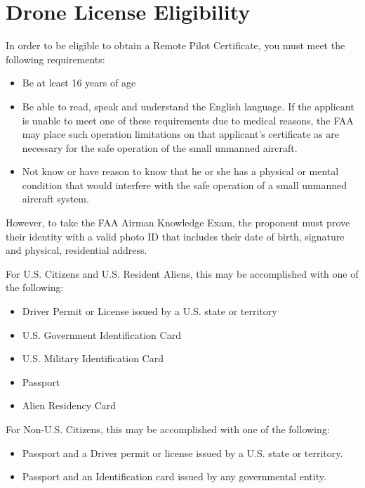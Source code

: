 \documentclass[
]{book}
\providecommand{\tightlist}{%
  \setlength{\itemsep}{0pt}\setlength{\parskip}{0pt}}
\begin{document}
\hypertarget{drone-license-eligibility}{%
\section{Drone License Eligibility}\label{drone-license-eligibility}}

In order to be eligible to obtain a Remote Pilot Certificate, you must meet the following requirements:

\begin{itemize}
\tightlist
\item
  Be at least 16 years of age
\item
  Be able to read, speak and understand the English language. If the applicant is unable to meet one of these requirements due to medical reasons, the FAA may place such operation limitations on that applicant's certificate as are necessary for the safe operation of the small unmanned aircraft.
\item
  Not know or have reason to know that he or she has a physical or mental condition that would interfere with the safe operation of a small unmanned aircraft system.
\end{itemize}

However, to take the FAA Airman Knowledge Exam, the proponent must prove their identity with a valid photo ID that includes their date of birth, signature and physical, residential address.

For U.S. Citizens and U.S. Resident Aliens, this may be accomplished with one of the following:

\begin{itemize}
\tightlist
\item
  Driver Permit or License issued by a U.S. state or territory
\item
  U.S. Government Identification Card
\item
  U.S. Military Identification Card
\item
  Passport
\item
  Alien Residency Card
\end{itemize}

For Non-U.S. Citizens, this may be accomplished with one of the following:

\begin{itemize}
\tightlist
\item
  Passport and a Driver permit or license issued by a U.S. state or territory.
\item
  Passport and an Identification card issued by any governmental entity.
\end{itemize}
\end{document}
